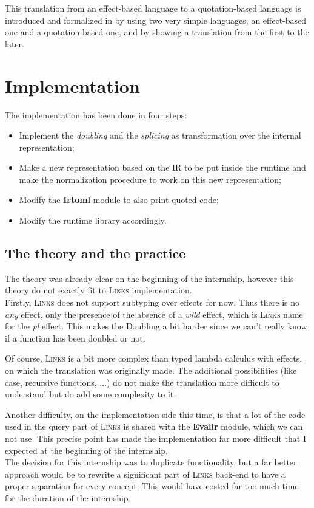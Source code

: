 \documentclass[11pt]{article}
\newcommand\mysc[1]{{\rmfamily\textsc{#1}}\xspace}
\newcommand\links{\mysc{Links}}
\newcommand\effect[1]{{\em #1}}
\newcommand\module[1]{{\bf #1}}
\begin{document}
This translation from an effect-based language to a quotation-based language is introduced and formalized in \cite{links:querycomp} by using two very simple languages, an effect-based one and a quotation-based one, and by showing a translation from the first to the later.

\section{Implementation\label{implem}}

The implementation has been done in four steps:
\begin{itemize}
\item Implement the \emph{doubling} and the \emph{splicing} as transformation over the internal representation;
\item Make a new representation based on the IR to be put inside the runtime and make the normalization procedure to work on this new representation;
\item Modify the \module{Irtoml} module to also print quoted code;
\item Modify the runtime library accordingly. 
\end{itemize}

\subsection{The theory and the practice}

The theory was already clear on the beginning of the internship, however this theory do not exactly fit to \links implementation.\\

Firstly, \links does not support subtyping over effects for now. Thus there is no \effect{any} effect, only the presence of the absence of a \effect{wild} effect, which is \links name for the \effect{pl} effect. This makes the Doubling a bit harder since we can't really know if a function has been doubled or not.

Of course, \links is a bit more complex than typed lambda calculus with effects, on which the translation was originally made. The additional possibilities (like case, recursive functions, ...) do not make the translation more difficult to understand but do add some complexity to it.

Another difficulty, on the implementation side this time, is that a lot of the code used in the query part of \links is shared with the \module{Evalir} module, which we can not use. This precise point has made the implementation far more difficult that I expected at the beginning of the internship.\\
The decision for this internship was to duplicate functionality, but a far better approach would be to rewrite a significant part of \links back-end to have a proper separation for every concept. This would have costed far too much time for the duration of the internship.
\end{document}
